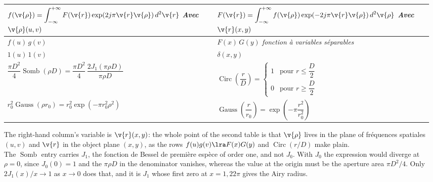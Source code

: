 \begin{table}[h!]
  \centering
  \begin{tabularx}{\textwidth}{>{\centering\arraybackslash}X >{\centering\arraybackslash}X}
    \toprule
    $\displaystyle f(\v{\rho})=\int_{-\infty}^{+\infty}F(\v{r})\exp(2j\pi \v{r}\v{\rho})\,d^2\v{r}$
      \newline \textit{Avec} $\v{\rho}(u,v)$
    & $\displaystyle F(\v{r})=\int_{-\infty}^{+\infty}f(\v{\rho})\exp(-2j\pi \v{r}\v{\rho})\,d^2\v{\rho}$
      \newline \textit{Avec} $\v{r}(x,y)$ \\
    \midrule
    $f(u)\,g(v)$
    & $F(x)\,G(y)$ \newline \textit{fonction à variables séparables} \\[8pt]
    $1(u)\,1(v)$ & $\delta(x,y)$ \\[8pt]
    $\dfrac{\pi D^2}{4}\operatorname{Somb}(\rho D)
      =\dfrac{\pi D^2}{4}\,\dfrac{2J_1(\pi\rho D)}{\pi\rho D}$
    & $\operatorname{Circ}\!\left(\dfrac{r}{D}\right)=
      \begin{cases}
        1 & \text{pour } r\le \dfrac{D}{2}\\[6pt]
        0 & \text{pour } r\ge \dfrac{D}{2}
      \end{cases}$ \\[20pt]
    $r_0^2\operatorname{Gauss}(\rho r_0)=r_0^2\exp(-\pi r_0^2\rho^2)$
    & $\operatorname{Gauss}\!\left(\dfrac{r}{r_0}\right)
      =\exp\!\left(-\pi\dfrac{r^2}{r_0^2}\right)$ \\
    \bottomrule
  \end{tabularx}
\end{table}

\begin{remark}
  The right-hand column's variable is $\v{r}(x,y)$: the whole point of the
  second table is that $\v{\rho}$ lives in the plane of fréquences spatiales
  $(u,v)$ and $\v{r}$ in the object plane $(x,y)$, as the rows
  $f(u)g(v)\lra F(x)G(y)$ and $\operatorname{Circ}(r/D)$ make plain.\\

  The $\operatorname{Somb}$ entry carries $J_1$, the fonction de Bessel de
  première espèce of order one, and not $J_0$. With $J_0$ the expression would
  diverge at $\rho=0$, since $J_0(0)=1$ and the $\pi\rho D$ in the denominator
  vanishes, whereas the value at the origin must be the aperture area
  $\pi D^2/4$. Only $2J_1(x)/x\to 1$ as $x\to 0$ does that, and it is $J_1$
  whose first zero at $x=1{,}22\pi$ gives the Airy radius.
\end{remark}

